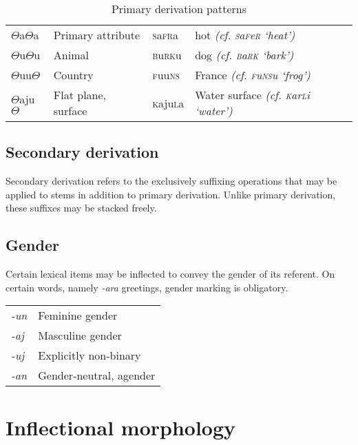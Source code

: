 \documentclass[a4paper,10pt,twoside,openright]{memoir}
\newcommand{\rootpart}{$\Theta$}
\begin{document}
\begin{table}[ht]
\begin{tabular}{llll}
    {\rootpart}a{\rootpart}a & Primary attribute & \textsc{s}a\textsc{fr}a & hot \emph{(cf. \textsc{s}a\textsc{f}e\textsc{r} `heat')} \\
    {\rootpart}u{\rootpart}u & Animal & \textsc{b}u\textsc{rk}u & dog \emph{(cf. \textsc{b}a\textsc{rk} `bark')} \\
    {\rootpart}uu{\rootpart} & Country & \textsc{f}uu\textsc{ns} & France \emph{(cf. \textsc{f}u\textsc{ns}u `frog')} \\
    {\rootpart}aju{\rootpart} & Flat plane, surface & \textsc{k}aju\textsc{l}a & Water surface \emph{(cf. \textsc{k}ar\textsc{l}i `water')}
    \end{tabular}
    \caption{Primary derivation patterns}
    \label{tab:primedevs}
\end{table}

\subsection{Secondary derivation}

Secondary derivation refers to the exclusively suffixing operations that may be applied to stems in addition to primary derivation. Unlike primary derivation, these suffixes may be stacked freely. 

\subsection{Gender}

Certain lexical items may be inflected to convey the gender of its referent. On certain words, namely \emph{-ara} greetings, gender marking is obligatory.

\begin{table}[ht]
    \centering
    \begin{tabular}{>{\em}ll}
    -un & Feminine gender \\
    -aj & Masculine gender \\
    -uj & Explicitly non-binary \\
    -an & Gender-neutral, agender \\
    \end{tabular}
\end{table}



\section{Inflectional morphology}
\end{document}
